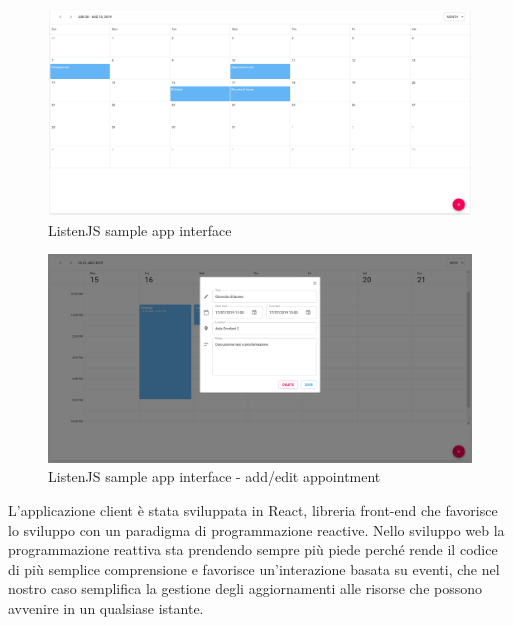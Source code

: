\documentclass[12pt,a4paper,openright,twoside]{report}
\begin{document}
\begin{figure}[htbp]
\centering
\includegraphics[width=1\textwidth]{assets/listenjs_sample_app.png}
\caption{ListenJS sample app interface}
\label{fig:listenjs_sample_app}
\end{figure}

\begin{figure}[htbp]
\centering
\includegraphics[width=1\textwidth]{assets/listenjs_sample_app_edit.png}
\caption{ListenJS sample app interface - add/edit appointment}
\label{fig:listenjs_sample_app_edit}
\end{figure}

L'applicazione client\cite{listenjs_sample_repo} è stata sviluppata in React\cite{react}, libreria front-end che favorisce lo sviluppo con un paradigma di programmazione reactive. Nello sviluppo web la programmazione reattiva sta prendendo sempre più piede perché rende il codice di più semplice comprensione e favorisce un'interazione basata su eventi\cite{reactive_programming}, che nel nostro caso semplifica la gestione degli aggiornamenti alle risorse che possono avvenire in un qualsiase istante.
\end{document}
